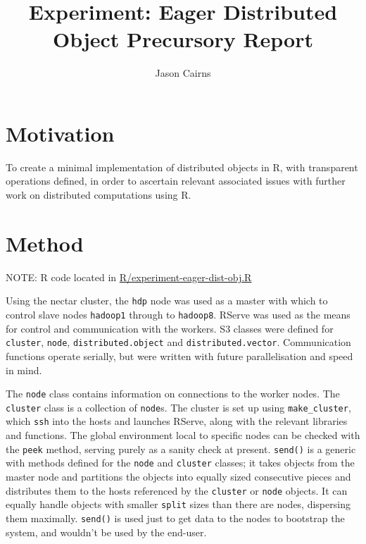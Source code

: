 \documentclass[a4paper,10pt]{article}
\begin{document}
\title{Experiment: Eager Distributed Object Precursory Report}
\author{Jason Cairns}
  
\maketitle

\section{Motivation}

To create a minimal implementation of distributed objects in R, with
transparent operations defined, in order to ascertain relevant associated
issues with further work on distributed computations using R.

\section{Method}

NOTE: R code located in
\href{../R/experiment-eager-dist-obj.R}{R/experiment-eager-dist-obj.R}

Using the nectar cluster, the \texttt{hdp} node was used as a master with which
to control slave nodes \texttt{hadoop1} through to \texttt{hadoop8}.
RServe was used as the means for control and communication with the workers.
S3 classes were defined for \texttt{cluster}, \texttt{node},
\texttt{distributed.object} and \texttt{distributed.vector}. 
Communication functions operate serially, but were written with future
parallelisation and speed in mind.

The \texttt{node} class contains information on connections to the worker nodes.
The \texttt{cluster} class is a collection of \texttt{node}s.
The cluster is set up using \texttt{make\_cluster}, which \texttt{ssh} into the
hosts and launches RServe, along with the relevant libraries and functions.
The global environment local to specific nodes can be checked with the
\texttt{peek} method, serving purely as a sanity check at present.
\texttt{send()} is a generic with methods defined for the \texttt{node} and
\texttt{cluster} classes;
it takes objects from the master node and partitions the objects into equally
sized consecutive pieces and distributes them to the hosts referenced by the
\texttt{cluster} or \texttt{node} objects.
It can equally handle objects with smaller \texttt{split} sizes than there are
nodes, dispersing them maximally.
\texttt{send()} is used just to get data to the nodes to bootstrap the system,
and wouldn't be used by the end-user.
\end{document}
